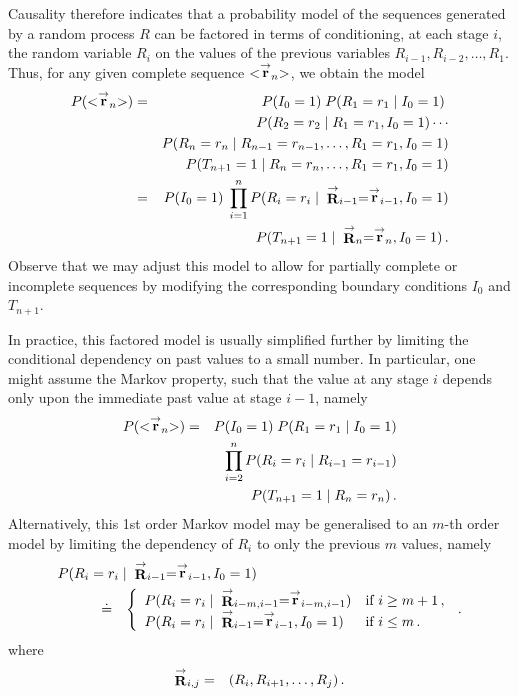 \documentclass{report}
\begin{document}
Causality therefore indicates that a probability model of the sequences generated by a random
process $R$ can be factored in terms of conditioning, at each stage $i$, the random
variable $R_i$ on the values of the previous variables $R_{i-1},R_{i-2},\ldots,R_1$.
Thus, for any given complete sequence $<\stackrel{\rightarrow}{\bf r}_n>$, we obtain
the model
\begin{eqnarray}
P(<\stackrel{\rightarrow}{\bf r}_{n}>)
& = & 
P(I_0=1)\;
P(R_1=r_1\;|\;I_0=1)\;
\nonumber\\&&
P(R_2=r_2\;|\;R_1=r_1,I_0=1)\cdots
\nonumber\\&&
P(R_n=r_n\;|\;R_{n-1}=r_{n-1},\ldots,R_1=r_1,I_0=1)
\nonumber\\&&
P(T_{n+1}=1\;|\;R_n=r_n,\ldots,R_1=r_1,I_0=1)
\\
& = &
P(I_0=1)\;
\prod_{i=1}^{n}
P(R_i=r_i\;|\;\stackrel{\rightarrow}{\bf R}_{i-1}=\stackrel{\rightarrow}{\bf r}_{i-1},I_0=1)
\nonumber\\&&
P(T_{n+1}=1\;|\;\stackrel{\rightarrow}{\bf R}_{n}=\stackrel{\rightarrow}{\bf r}_{n},I_0=1)
\,.
\end{eqnarray}
Observe that we may adjust this model to allow for partially complete or incomplete sequences
by modifying the corresponding boundary conditions $I_0$ and $T_{n+1}$.

In practice, this factored model is usually simplified further by limiting the 
conditional dependency on past values to a small number.
In particular, one might assume the Markov property, such that the value at any stage
$i$ depends only upon the immediate past value at stage $i-1$, namely
\begin{eqnarray}
P(<\stackrel{\rightarrow}{\bf r}_{n}>)
& = &
P(I_0=1)\;P(R_1=r_1\;|\;I_0=1)
\nonumber\\&&
\prod_{i=2}^{n}
P(R_i=r_i\;|\;R_{i-1}=r_{i-1})
\nonumber\\&&
P(T_{n+1}=1\;|\;R_{n}=r_{n})
\,.
\end{eqnarray}
Alternatively, this 1st order Markov model may be generalised to an $m$-th order model
by limiting the dependency of $R_i$ to only the previous $m$ values, namely
\begin{eqnarray}
P(R_i=r_i\;|\;\stackrel{\rightarrow}{\bf R}_{i-1}=\stackrel{\rightarrow}{\bf r}_{i-1},I_0=1)
\hspace*{-40mm} &&
\nonumber\\
& \doteq &
\left\{
\begin{array}{ll}
P(R_i=r_i\;|\;\stackrel{\rightarrow}{\bf R}_{i-m,i-1}=\stackrel{\rightarrow}{\bf r}_{i-m,i-1})
& \mbox{if $i\ge m+1$}\,,
\\
P(R_i=r_i\;|\;\stackrel{\rightarrow}{\bf R}_{i-1}=\stackrel{\rightarrow}{\bf r}_{i-1}
,I_0=1)
& \mbox{if $i\le m$}\,.
\end{array}
\right.
\,.
\end{eqnarray}
where
\begin{eqnarray}
\stackrel{\rightarrow}{\bf R}_{i,j}
& = &
(R_{i},R_{i+1},\ldots,R_{j})\,.
\end{eqnarray}


\end{document}
